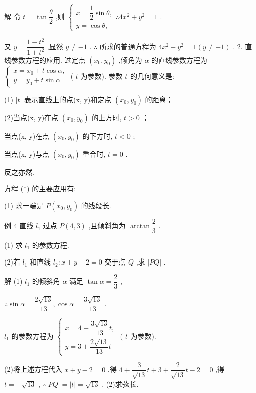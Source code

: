 解 令 $t = \tan \dfrac{\theta }{2}$ ,则 $\left\{  {\begin{array}{l} x = \dfrac{1}{2}\sin \theta , \\  y = \cos \theta , \end{array}\therefore 4{x}^{2} + {y}^{2} = 1}\right.$ .

又 $y = \dfrac{1 - {t}^{2}}{1 + {t}^{2}}$ ,显然 $y \neq   - 1$ . $\therefore$ 所求的普通方程为 $4{x}^{2} + {y}^{2} = 1\left( {y \neq   - 1}\right)$ . 2. 直线参数方程的应用. 过定点 $\left( {{x}_{0},{y}_{0}}\right)$ ,倾角为 $\alpha$ 的直线参数方程为 $\left\{  \begin{array}{l} x = {x}_{0} + t\cos \alpha , \\  y = {y}_{0} + t\sin \alpha  \end{array}\right.$ ( $t$ 为参数). 参数 $t$ 的几何意义是:

(1) $\left| t\right|$ 表示直线上的点(x, y)和定点 $\left( {{x}_{0},{y}_{0}}\right)$ 的距离；

(2)当点(x, y)在点 $\left( {{x}_{0},{y}_{0}}\right)$ 的上方时, $t > 0$ ；

当点(x, y)在点 $\left( {{x}_{0},{y}_{0}}\right)$ 的下方时, $t < 0$ ;

当点(x, y)与点 $\left( {{x}_{0},{y}_{0}}\right)$ 重合时, $t = 0$ .

反之亦然.

方程 (*) 的主要应用有:

(1) 求一端是 $P\left( {{x}_{0},{y}_{0}}\right)$ 的线段长.

例 4 直线 ${l}_{1}$ 过点 $P\left( {4,3}\right)$ ,且倾斜角为 $\arctan \dfrac{2}{3}$ .

(1) 求 ${l}_{1}$ 的参数方程.

(2)若 ${l}_{1}$ 和直线 ${l}_{2} : x + y - 2 = 0$ 交于点 $Q$ ,求 $\left| {PQ}\right|$ .

解 (1) ${l}_{1}$ 的倾斜角 $\alpha$ 满足 $\tan \alpha  = \dfrac{2}{3}$ ,

$\therefore \sin \alpha  = \dfrac{2\sqrt{13}}{13},\cos \alpha  = \dfrac{3\sqrt{13}}{13}$ .

${l}_{1}$ 的参数方程为 $\left\{  {\begin{array}{l} x = 4 + \dfrac{3\sqrt{13}}{13}t, \\  y = 3 + \dfrac{2\sqrt{13}}{13}t \end{array}\text{ ( }t}\right.$ 为参数).

(2)将上述方程代入 $x + y - 2 = 0$ ,得 $4 + \dfrac{3}{\sqrt{13}}t + 3 + \dfrac{2}{\sqrt{13}}t - 2 = 0$ ,得 $t =  - \sqrt{13}$ , $\therefore \left| {PQ}\right|  = \left| t\right|  = \sqrt{13}$ . (2)求弦长.

